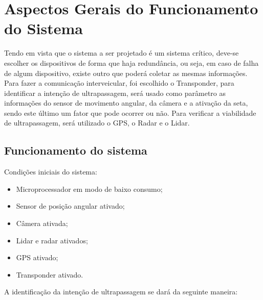 \chapter{Aspectos Gerais do Funcionamento do Sistema}

Tendo em vista que o sistema a ser projetado é um sistema crítico, deve-se escolher os dispositivos de forma que haja redundância, ou seja, em caso de falha de algum dispositivo, existe outro que poderá coletar as mesmas informações. Para fazer a comunicação interveicular, foi escolhido o Transponder, para identificar a intenção de ultrapassagem, será usado como parâmetro as informações do sensor de movimento angular, da câmera e a ativação da seta, sendo este último um fator que pode ocorrer ou não. Para verificar a viabilidade de ultrapassagem, será utilizado o GPS, o Radar e o Lidar.

\section{Funcionamento do sistema}

Condições iniciais do sistema:

\begin{itemize}
	\item Microprocessador em modo de baixo consumo;
	\item Sensor de posição angular ativado;
	\item Câmera ativada;
	\item Lidar e radar ativados;
	\item GPS ativado;
	\item Transponder ativado.
\end{itemize}

A identificação da intenção de ultrapassagem se dará da seguinte maneira:

